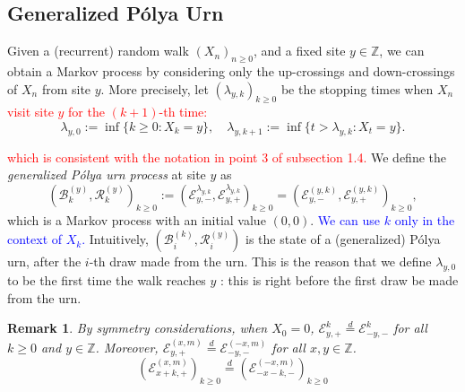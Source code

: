 \documentclass[twoside,12pt,a4paper]{article}
\newtheorem{remark}{Remark}[section]
\numberwithin{equation}{section}
\newcommand{\edt}[1]{\textcolor{red}{#1}} %
\newcommand{\comment}[1]{\textcolor{blue}{#1}}
\begin{document}
	\subsection{Generalized P\'{o}lya  Urn}
	Given a (recurrent) random walk $(X_n)_{n\geq 0}$, and a fixed site $y\in \mathbb{Z}$, we can obtain a Markov process by considering only the up-crossings and down-crossings of $X_n$ from site $y$. More precisely, let $(\lambda_{y,k})_{k\geq 0}$ be the stopping times when $X_n$ \edt{visit site $y$ for the $\left( k+1 \right) $-th time:}
	\[
		\lambda_{y,0} :=\inf\{ k\geq 0: X_k = y \} , \quad \lambda_{y,k+1} := \inf\{ t> \lambda_{y, k}: X_t = y \}.
	   \] 
	
	   \edt{which is consistent with the notation in point 3 of subsection 1.4. }
	   We define the \textit{generalized P\'olya urn process} at site $y$ as 
	  \begin{equation} \label{eq: RW to GPU}
	   \left(\mathcal{B}^{(y)}_{k},\mathcal{R}^{(y)}_{k} \right)_{k\ge 0}
	   :=\left(\mathcal{E}^{\lambda_{y,k}}_{y,-}, \mathcal{E}^{\lambda_{y,k}}_{y,+}\right)_{k\geq 0} 
	   =  \left(\mathcal{E}^{(y,k)}_{y,-}, \mathcal{E}^{(y,k)}_{y,+}\right)_{k\geq 0},
	   \end{equation}
	   which is a Markov process with an initial value $(0,0)$. \comment{We can use $k$ only in the context of $X_k$.} Intuitively, $\left(\mathcal{B}_{i}^{(k)},\mathcal{R}_{i}^{(y)} \right)$ is the state of a (generalized) P\'olya urn, after the $i$-th draw made from the urn. This is the reason that we define $\lambda_{y, 0}$ to be the first time the walk reaches $y$ : this is right before the first draw be made from the urn. 
	\begin{remark}
		\label{rem:symmetry}
		By symmetry considerations, when $X_0 = 0$, $\mathcal{E}_{y, + }^{k} \overset{d}{=} \mathcal{E}_{-y, - }^{k}$ for all $k \ge 0$ and $y \in \mathbb{Z}$. Moreover, $\mathcal{E}_{y, +}^{(x, m)} \overset{d}{=} \mathcal{E}_{-y, -}^{(-x, m)}$ for all $x, y \in \mathbb{Z}$.
\[
		 \left(\mathcal{E}^{(x,m)}_{x+k,+} \right)_{k\geq 0} \overset{d}{=} \left(\mathcal{E}^{(-x,m)}_{-x-k,-} \right)_{k\geq 0}
		\]
	   \end{remark}

	   
	 
\end{document}
